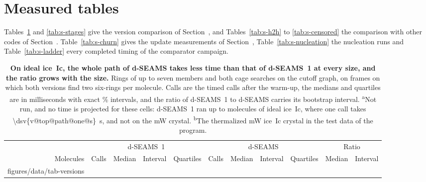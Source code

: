 \documentclass[preprint,12pt]{elsarticle}
\makeatletter
\newcommand{\tabbody}[1]{\@@input #1 }
\makeatother
\begin{document}
\section{Measured tables}
\label{sec:s-tables}

Tables~\ref{tab:s-versions} and \ref{tab:s-stages} give the version comparison of Section~, and Tables~\ref{tab:s-h2h} to \ref{tab:s-censored} the comparison with other codes of Section~.
Table~\ref{tab:s-churn} gives the update measurements of Section~, Table~\ref{tab:s-nucleation} the nucleation runs and Table~\ref{tab:s-ladder} every completed timing of the comparator campaign.

\begin{table}
\centering
\caption{\textbf{On ideal ice~Ic, the whole path of d-SEAMS takes less time than that of d-SEAMS~1 at every size, and the ratio grows with the size.}
Rings of up to seven members and both cage searches on the cutoff graph, on frames on which both versions find two six-rings per molecule.
Calls are the timed calls after the warm-up, the medians and quartiles are in milliseconds with exact \% intervals, and the ratio of d-SEAMS~1 to d-SEAMS carries its bootstrap interval.
\textsuperscript{a}Not run, and no time is projected for these cells: d-SEAMS~1 ran up to  molecules of ideal ice~Ic, where one call takes \qty{\dsv{v@top@path@one@s}}{\second}, and not on the mW crystal.
\textsuperscript{b}The thermalized mW ice~Ic crystal in the test data of the program.}
\label{tab:s-versions}
\footnotesize
\setlength{\tabcolsep}{3pt}
\begin{tabular}{@{}rrrccrrccrc@{}}
\toprule
 & \multicolumn{4}{c}{d-SEAMS~1} & \multicolumn{4}{c}{d-SEAMS} & \multicolumn{2}{c}{Ratio} \\
\cmidrule(lr){2-5}\cmidrule(lr){6-9}\cmidrule(l){10-11}
Molecules & Calls & Median & Interval & Quartiles & Calls & Median & Interval & Quartiles & Median & Interval \\
\midrule
\tabbody{figures/data/tab-versions}
\bottomrule
\end{tabular}


\end{table}
\end{document}
